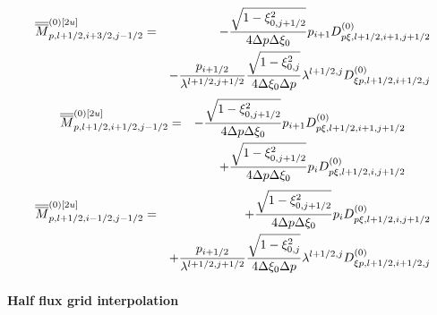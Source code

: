 \begin{eqnarray}
\overline{\overline{M}}_{p,l+1/2,i+3/2,j-1/2}^{\left( 0\right) \left[ 2u%
\right] } &=&-\frac{\sqrt{1-\xi _{0,j+1/2}^{2}}}{4\Delta p\Delta \xi _{0}}%
p_{i+1}D_{p\xi ,l+1/2,i+1,j+1/2}^{\left( 0\right) }  \notag \\
&&-\frac{p_{i+1/2}}{\lambda ^{l+1/2,j+1/2}}\frac{\sqrt{1-\xi _{0,j}^{2}}}{%
4\Delta \xi _{0}\Delta p}\lambda ^{l+1/2,j}D_{\xi p,l+1/2,i+1/2,j}^{\left(
0\right) }
\end{eqnarray}%
\begin{eqnarray}
\overline{\overline{M}}_{p,l+1/2,i+1/2,j-1/2}^{\left( 0\right) \left[ 2u%
\right] } &=&-\frac{\sqrt{1-\xi _{0,j+1/2}^{2}}}{4\Delta p\Delta \xi _{0}}%
p_{i+1}D_{p\xi ,l+1/2,i+1,j+1/2}^{\left( 0\right) }  \notag \\
&&+\frac{\sqrt{1-\xi _{0,j+1/2}^{2}}}{4\Delta p\Delta \xi _{0}}p_{i}D_{p\xi
,l+1/2,i,j+1/2}^{\left( 0\right) }
\end{eqnarray}%
\begin{eqnarray}
\overline{\overline{M}}_{p,l+1/2,i-1/2,j-1/2}^{\left( 0\right) \left[ 2u%
\right] } &=&+\frac{\sqrt{1-\xi _{0,j+1/2}^{2}}}{4\Delta p\Delta \xi _{0}}%
p_{i}D_{p\xi ,l+1/2,i,j+1/2}^{\left( 0\right) }  \notag \\
&&+\frac{p_{i+1/2}}{\lambda ^{l+1/2,j+1/2}}\frac{\sqrt{1-\xi _{0,j}^{2}}}{%
4\Delta \xi _{0}\Delta p}\lambda ^{l+1/2,j}D_{\xi p,l+1/2,i+1/2,j}^{\left(
0\right) }
\end{eqnarray}

\paragraph{Half flux grid interpolation}

